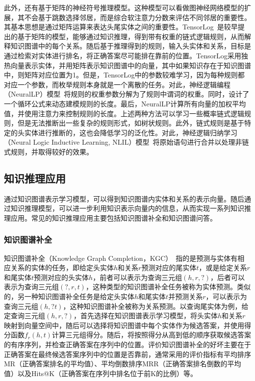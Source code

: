 \documentclass[algorithmlist, AutoFakeBold, AutoFakeSlant, figurelist, tablelist, nomlist, masters]{seuthesix}
\begin{document}
此外，还有基于矩阵的神经符号推理模型。这种模型可以看做图神经网络模型的扩展，其不会基于跳数选择邻居，而是综合软注意力分数来评估不同邻居的重要性。其基本思想是通过矩阵运算来表达头尾实体之间的重要性。TensorLog~\cite{cohen2016tensorlog}是较早提出的基于矩阵的模型，能够通过知识推理，得到带有权重的链式逻辑规则，从而解释知识图谱中的每个关系。随后基于推理得到的规则，输入头实体和关系，目标是通过检索对实体进行排名，将正确答案尽可能排在靠前的位置。TensorLog采用独热向量表示实体，并用矩阵表示知识图谱中的向量，其中如果知识存在于知识图谱中，则矩阵对应位置为1。但是，TensorLog中的参数较难学习，因为每种规则都对应一个参数，而枚举规则本身就是一个离散的任务。对此，神经逻辑编程（NeuralLP）模型~\cite{yang2017differentiable}将规则的权重参数分解为了规则中谓词的权重。同时，设计了一个循环公式来动态建模规则的长度。最后，NeuralLP计算所有向量的加权平均值，并使用注意力来控制规则的长度。上述两种方法可以学习一些概率链式逻辑规则，但是无法推断出一些复杂的规则形式，如树状规则。此外，链式规则是基于特定的头实体进行推断的，这也会降低学习的泛化性。对此，神经逻辑归纳学习（Neural Logic Inductive Learning, NLIL）模型~\cite{yang2019learn}将原始语句进行合并以处理非链式规则，并取得较好的效果。

\subsection{知识推理应用}
通过知识图谱表示学习模型，可以得到知识图谱内实体和关系的表示向量。随后通过知识推理模型，可以进一步利用知识表示向量内的信息，从而实现一系列知识推理应用。常见的知识推理应用主要包括知识图谱补全和知识图谱问答。

\subsubsection{知识图谱补全}
知识图谱补全（Knowledge Graph Completion，KGC）~\cite{vu2019capsule}指的是预测与实体有相应关系的实体的任务，即给定头实体$h$和关系$r$预测对应的尾实体$t$，或是给定关系$r$和尾实体$t$预测对应的头实体$h$，前者可以表示为查询三元组$\left(h, r, ?\right)$，后者可以表示为查询三元组$\left(?, r, t\right)$，这种类型的知识图谱补全任务被称为实体预测。类似的，另一种知识图谱补全任务是给定头实体$h$和尾实体$t$并预测关系$r$，可以表示为查询三元组$\left(h, ? t\right)$，这种知识图谱补全被称为关系预测。以查询尾实体为例，给定查询三元组$\left(h, r, ?\right)$，首先选择在知识图谱表示学习模型，将头实体$h$和关系$r$映射到向量空间中，随后可以选择将知识图谱中每个实体作为候选答案，并使用得分函数$f_r\left(h, t\right)$计算三元组得分。随后，将按照得分从高到低的顺序获取候选答案的有序序列，并检查正确答案在序列中的位置。评价知识图谱补全的好坏主要在于正确答案在最终候选答案序列中的位置是否靠前，通常采用的评价指标有平均排序MR（正确答案排名的平均值）、平均倒数排序MRR（正确答案排名倒数的平均值）以及Hits@K（正确答案在序列中排名位于前K的比例）等。
\end{document}
